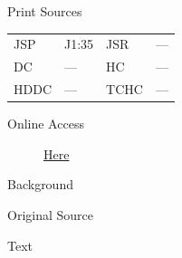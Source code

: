 			\begin{description}
					\item[Print Sources]
				\end{description}

					\begin{tabular}{p{0.5in}p{1in}p{0.5in}p{1in}}
					JSP	 	& J1:35		& JSR 		& --- \\
					DC	 	& --- 		& HC 		& --- \\
					HDDC 	& ---		& TCHC 		& --- \\
					\end{tabular}
				
				\begin{description}
					\item[Online Access] \href{https://www.josephsmithpapers.org/paper-summary/journal-1832-1834/64}{Here}
				\end{description}
				
				\begin{description}
					\item[Background]
				\end{description}
				
				
				\begin{description}
					\item[Original Source]
				\end{description}
				
				
				\begin{description}
					\item[Text]
				\end{description}
				
